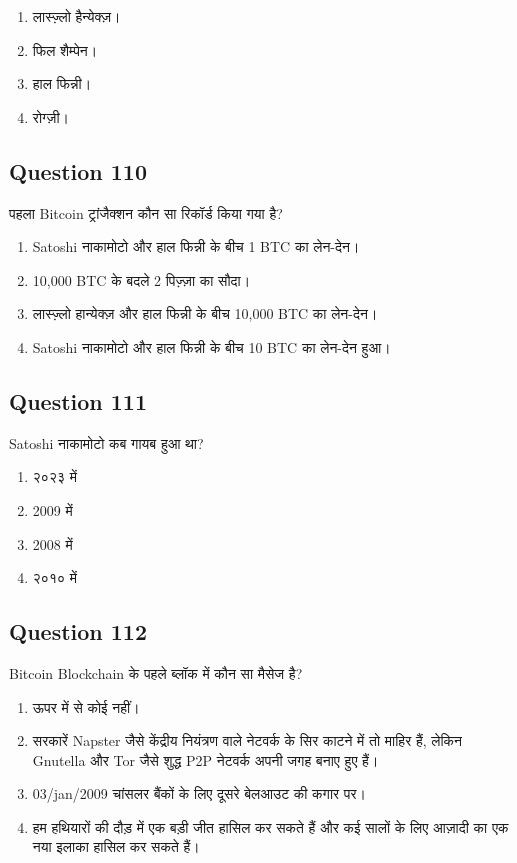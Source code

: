 \documentclass[12pt,a4paper]{article}
\begin{document}
\begin{enumerate}[label=\Alph*., leftmargin=*]
\item लास्ज़्लो हैन्येक्ज़।
\item फिल शैम्पेन।
\item हाल फिन्नी।
\item रोग्ज़ी।
\end{enumerate}

\bigskip


\subsection*{Question 110}
पहला Bitcoin ट्रांजैक्शन कौन सा रिकॉर्ड किया गया है?

\begin{enumerate}[label=\Alph*., leftmargin=*]
\item Satoshi नाकामोटो और हाल फिन्नी के बीच 1 BTC का लेन-देन।
\item 10,000 BTC के बदले 2 पिज़्ज़ा का सौदा।
\item लास्ज़्लो हान्येक्ज़ और हाल फिन्नी के बीच 10,000 BTC का लेन-देन।
\item Satoshi नाकामोटो और हाल फिन्नी के बीच 10 BTC का लेन-देन हुआ।
\end{enumerate}

\bigskip


\subsection*{Question 111}
Satoshi नाकामोटो कब गायब हुआ था?

\begin{enumerate}[label=\Alph*., leftmargin=*]
\item २०२३ में
\item 2009 में
\item 2008 में
\item २०१० में
\end{enumerate}

\bigskip


\subsection*{Question 112}
Bitcoin Blockchain के पहले ब्लॉक में कौन सा मैसेज है?

\begin{enumerate}[label=\Alph*., leftmargin=*]
\item ऊपर में से कोई नहीं।
\item सरकारें Napster जैसे केंद्रीय नियंत्रण वाले नेटवर्क के सिर काटने में तो माहिर हैं, लेकिन Gnutella और Tor जैसे शुद्ध P2P नेटवर्क अपनी जगह बनाए हुए हैं।
\item 03/jan/2009 चांसलर बैंकों के लिए दूसरे बेलआउट की कगार पर।
\item हम हथियारों की दौड़ में एक बड़ी जीत हासिल कर सकते हैं और कई सालों के लिए आज़ादी का एक नया इलाका हासिल कर सकते हैं।
\end{enumerate}
\end{document}
